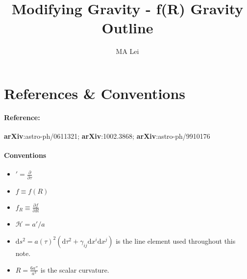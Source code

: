 \documentclass[12pt,a4paper]{article}
\begin{document}
\title{Modifying Gravity - f(R) Gravity \\ Outline}
\author{MA Lei}
\maketitle

\pagestyle{empty}

\newcommand{\arXiv}{{\bf arXiv}}
\newcommand{\dd}{\mathrm d}
\newcommand{\HH}{\mathcal H}
\newcommand{\CN}{{\it Cosmologia Notebook - 2012-02}}
\newenvironment{eqnset}
{\begin{equation}\left \bracevert \begin{array}{l}}
{\end{array} \right. \end{equation}}

\newenvironment{eqn}
{\begin{equation}\left \bracevert \begin{array}{l}}
{\end{array} \right. \end{equation}}







\section{References \& Conventions}

\paragraph{Reference:} \arXiv:astro-ph/0611321; \arXiv:1002.3868; \arXiv:astro-ph/9910176

\paragraph{Conventions} \begin{itemize}
\item
$'=\frac{\partial }{\partial \tau}$
\item
$f\equiv f(R)$
\item
$f_R\equiv \frac{\partial f}{\partial R}$
\item
$\mathcal H = a'/a$
\item
$\mathrm ds^2 = a(\tau)^2(\mathrm d\tau^2 + \gamma_{ij}\mathrm dx^i\mathrm dx^j)$ is the line element used throughout this note.
\item
$R = \frac{6a''}{a^3}$ is the scalar curvature.
\end{itemize}
\end{document}
